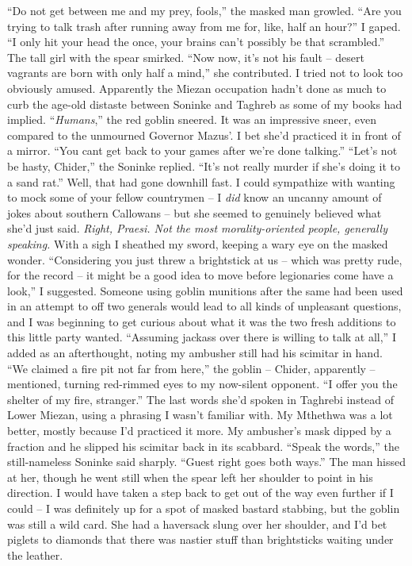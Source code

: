\documentclass[12pt, openany]{book}
\begin{document}
“Do not get between me and my prey, fools,” the masked man growled.
“Are you trying to talk trash after running away from me for, like, half an hour?” I gaped. “I only hit your head the once, your brains can’t possibly be that scrambled.”
The tall girl with the spear smirked. “Now now, it’s not his fault – desert vagrants are born with only half a mind,” she contributed.
I tried not to look too obviously amused. Apparently the Miezan occupation hadn’t done as much to curb the age-old distaste between Soninke and Taghreb as some of my books had implied.
“\textit{Humans},” the red goblin sneered. It was an impressive sneer, even compared to the unmourned Governor Mazus’. I bet she’d practiced it in front of a mirror. “You cant get back to your games after we’re done talking.”
“Let’s not be hasty, Chider,” the Soninke replied. “It’s not really murder if she’s doing it to a sand rat.”
Well, that had gone downhill fast. I could sympathize with wanting to mock some of your fellow countrymen – I \textit{did }know an uncanny amount of jokes about southern Callowans – but she seemed to genuinely believed what she’d just said. \textit{Right, Praesi. Not the most morality-oriented people, generally speaking.} With a sigh I sheathed my sword, keeping a wary eye on the masked wonder.
“Considering you just threw a brightstick at us – which was pretty rude, for the record – it might be a good idea to move before legionaries come have a look,” I suggested.
Someone using goblin munitions after the same had been used in an attempt to off two generals would lead to all kinds of unpleasant questions, and I was beginning to get curious about what it was the two fresh additions to this little party wanted.
“Assuming jackass over there is willing to talk at all,” I added as an afterthought, noting my ambusher still had his scimitar in hand.
“We claimed a fire pit not far from here,” the goblin – Chider, apparently – mentioned, turning red-rimmed eyes to my now-silent opponent. “I offer you the shelter of my fire, stranger.”
The last words she’d spoken in Taghrebi instead of Lower Miezan, using a phrasing I wasn’t familiar with. My Mthethwa was a lot better, mostly because I’d practiced it more. My ambusher’s mask dipped by a fraction and he slipped his scimitar back in its scabbard.
“Speak the words,” the still-nameless Soninke said sharply. “Guest right goes both ways.”
The man hissed at her, though he went still when the spear left her shoulder to point in his direction. I would have taken a step back to get out of the way even further if I could – I was definitely up for a spot of masked bastard stabbing, but the goblin was still a wild card. She had a haversack slung over her shoulder, and I’d bet piglets to diamonds that there was nastier stuff than brightsticks waiting under the leather.
\end{document}

